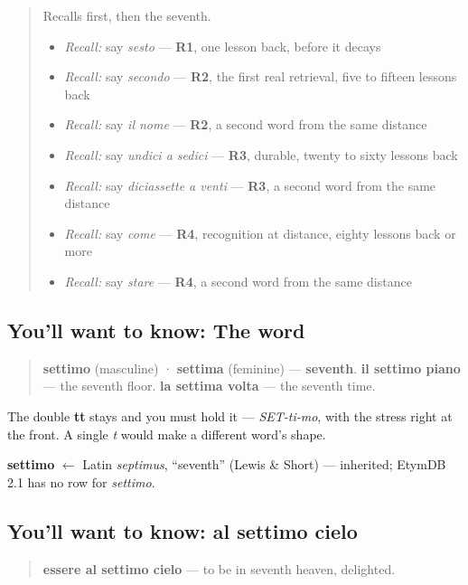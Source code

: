 \label{lesson:IT-C27-settimo}



\begin{quote}
Recalls first, then the seventh.

\begin{itemize}
\raggedright
  \item \emph{Recall:} say \emph{sesto} — \textbf{R1}, one lesson back, before it decays
  \item \emph{Recall:} say \emph{secondo} — \textbf{R2}, the first real retrieval, five to fifteen lessons back
  \item \emph{Recall:} say \emph{il nome} — \textbf{R2}, a second word from the same distance
  \item \emph{Recall:} say \emph{undici a sedici} — \textbf{R3}, durable, twenty to sixty lessons back
  \item \emph{Recall:} say \emph{diciassette a venti} — \textbf{R3}, a second word from the same distance
  \item \emph{Recall:} say \emph{come} — \textbf{R4}, recognition at distance, eighty lessons back or more
  \item \emph{Recall:} say \emph{stare} — \textbf{R4}, a second word from the same distance
\end{itemize}
\end{quote}

\subsection*{You'll want to know: The word}
\begin{quote}
\textbf{settimo} (masculine) · \textbf{settima} (feminine) — \textbf{seventh}. \textbf{il settimo piano} — the seventh floor. \textbf{la settima volta} — the seventh time.
\end{quote}

The double \textbf{tt} stays and you must hold it — \emph{SET-ti-mo}, with the stress right at the front. A single \emph{t} would make a different word's shape.

\begin{cousinweb}
\textbf{settimo} $\leftarrow$ Latin \emph{septimus}, \textquotedblleft{}seventh\textquotedblright{} (Lewis \& Short) — inherited; EtymDB 2.1 has no row for \emph{settimo}.
\end{cousinweb}

\subsection*{You'll want to know: al settimo cielo}
\begin{quote}
\textbf{essere al settimo cielo} — to be in seventh heaven, delighted.
\end{quote}

